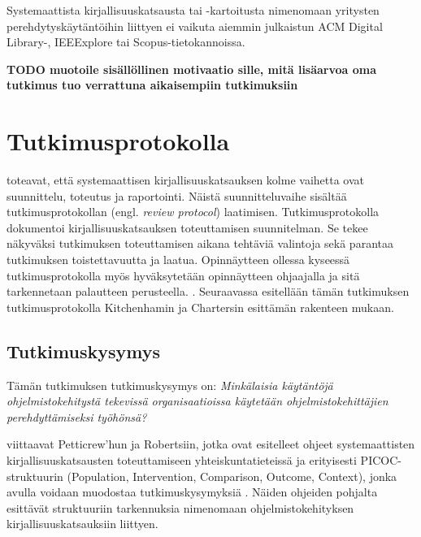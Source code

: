 \documentclass[utf8]{gradu3}
\begin{document}
Systemaattista kirjallisuuskatsausta tai -kartoitusta nimenomaan yritysten perehdytyskäytäntöihin liittyen ei vaikuta aiemmin julkaistun ACM Digital Library-, IEEExplore tai Scopus-tietokannoissa.

\textbf{TODO muotoile sisällöllinen motivaatio sille, mitä lisäarvoa oma tutkimus tuo verrattuna aikaisempiin tutkimuksiin}

\chapter{Tutkimusprotokolla}

\textcite{kitchenham-charters-2007} toteavat, että systemaattisen kirjallisuuskatsauksen kolme vaihetta ovat suunnittelu, toteutus ja raportointi. Näistä suunnitteluvaihe sisältää tutkimusprotokollan (engl. \textit{review protocol}) laatimisen. Tutkimusprotokolla dokumentoi kirjallisuuskatsauksen toteuttamisen suunnitelman. Se tekee näkyväksi tutkimuksen toteuttamisen aikana tehtäviä valintoja sekä parantaa tutkimuksen toistettavuutta ja laatua. Opinnäytteen ollessa kyseessä tutkimusprotokolla myös hyväksytetään opinnäytteen ohjaajalla ja sitä tarkennetaan palautteen perusteella. \parencite{kitchenham-charters-2007}. Seuraavassa esitellään tämän tutkimuksen tutkimusprotokolla Kitchenhamin ja Chartersin esittämän rakenteen mukaan.

\section{Tutkimuskysymys}
\label{luku:tutkimuskysymys}

Tämän tutkimuksen tutkimuskysymys on: \textit{Minkälaisia käytäntöjä ohjelmistokehitystä tekevissä organisaatioissa käytetään ohjelmistokehittäjien perehdyttämiseksi työhönsä?}

\textcite{kitchenham-charters-2007} viittaavat Petticrew'hun ja Robertsiin, jotka ovat esitelleet ohjeet systemaattisten kirjallisuuskatsausten toteuttamiseen yhteiskuntatieteissä ja erityisesti PICOC-struktuurin (Population, Intervention, Comparison, Outcome, Context), jonka avulla voidaan muodostaa tutkimuskysymyksiä \parencite{petticrew-roberts-2006}. Näiden ohjeiden pohjalta \textcite{kitchenham-charters-2007} esittävät struktuuriin tarkennuksia nimenomaan ohjelmistokehityksen kirjallisuuskatsauksiin liittyen. 
\end{document}
